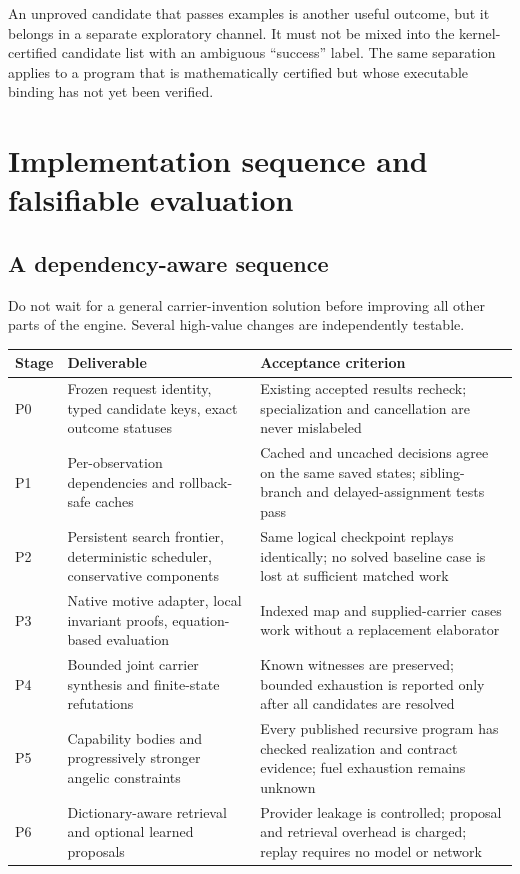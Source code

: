 \documentclass[11pt,a4paper]{article}
\theoremstyle{definition}
\theoremstyle{remark}
\begin{document}
An unproved candidate that passes examples is another useful outcome, but it
belongs in a separate exploratory channel. It must not be mixed into the
kernel-certified candidate list with an ambiguous ``success'' label. The
same separation applies to a program that is mathematically certified but
whose executable binding has not yet been verified.

\section{Implementation sequence and falsifiable evaluation}\label{sec:roadmap}

\subsection{A dependency-aware sequence}
Do not wait for a general carrier-invention solution before improving all other
parts of the engine. Several high-value changes are independently testable.

\begin{longtable}{@{}L{12mm}L{62mm}L{77mm}@{}}
\toprule
Stage & Deliverable & Acceptance criterion\\
\midrule\endhead
P0 & Frozen request identity, typed candidate keys, exact outcome statuses & Existing accepted results recheck; specialization and cancellation are never mislabeled\\
P1 & Per-observation dependencies and rollback-safe caches & Cached and uncached decisions agree on the same saved states; sibling-branch and delayed-assignment tests pass\\
P2 & Persistent search frontier, deterministic scheduler, conservative components & Same logical checkpoint replays identically; no solved baseline case is lost at sufficient matched work\\
P3 & Native motive adapter, local invariant proofs, equation-based evaluation & Indexed map and supplied-carrier cases work without a replacement elaborator\\
P4 & Bounded joint carrier synthesis and finite-state refutations & Known witnesses are preserved; bounded exhaustion is reported only after all candidates are resolved\\
P5 & Capability bodies and progressively stronger angelic constraints & Every published recursive program has checked realization and contract evidence; fuel exhaustion remains unknown\\
P6 & Dictionary-aware retrieval and optional learned proposals & Provider leakage is controlled; proposal and retrieval overhead is charged; replay requires no model or network\\
\bottomrule
\end{longtable}
\end{document}
